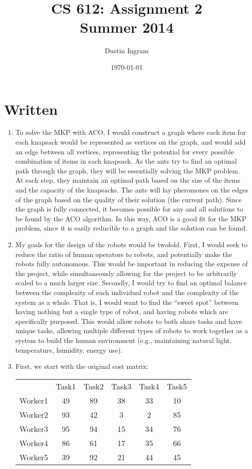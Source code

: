 \documentclass{article}
\title{CS 612: Assignment 2\\Summer 2014}
\author{Dustin Ingram}
\date{\today}
\begin{document}
\maketitle

\section*{Written}


\begin{enumerate}

\item{} %
To solve the MKP with ACO, I would construct a graph where each item for each knapsack would be represented as vertices on the graph, and would add an edge between all vertices, representing the potential for every possible combination of items in each knapsack. As the ants try to find an optimal path through the graph, they will be essentially solving the MKP problem. At each step, they maintain an optimal path based on the size of the items and the capacity of the knapsacks. The ants will lay pheromones on the edges of the graph based on the quality of their solution (the current path). Since the graph is fully connected, it becomes possible for any and all solutions to be found by the ACO algorithm. In this way, ACO is a good fit for the MKP problem, since it is easily reducible to a graph and the solution can be found.

\item{} %
My goals for the design of the robots would be twofold. First, I would seek to reduce the ratio of human operators to robots, and potentially make the robots fully autonomous. This would be important in reducing the expense of the project, while simultaneously allowing for the project to be arbitrarily scaled to a much larger size. Secondly, I would try to find an optimal balance between the complexity of each individual robot and the complexity of the system as a whole. That is, I would want to find the ``sweet spot'' between having nothing but a single type of robot, and having robots which are specifically purposed. This would allow robots to both share tasks and have unique tasks, allowing multiple different types of robots to work together as a system to build the human environment (e.g., maintaining natural light, temperature, humidity, energy use).


\item{} %
First, we start with the original cost matrix:

\begin{tabular}{ c|c|c|c|c|c }
    & Task1 & Task2 & Task3 & Task4 & Task5 \\
    Worker1 & 49 & 89 & 38 & 33 & 10 \\
    Worker2 & 93 & 42 &  3 &  2 & 85 \\
    Worker3 & 95 & 94 & 15 & 34 & 76 \\
    Worker4 & 86 & 61 & 17 & 35 & 66 \\
    Worker5 & 39 & 92 & 21 & 44 & 45 \\
\end{tabular}


\end{enumerate}
\end{document}
